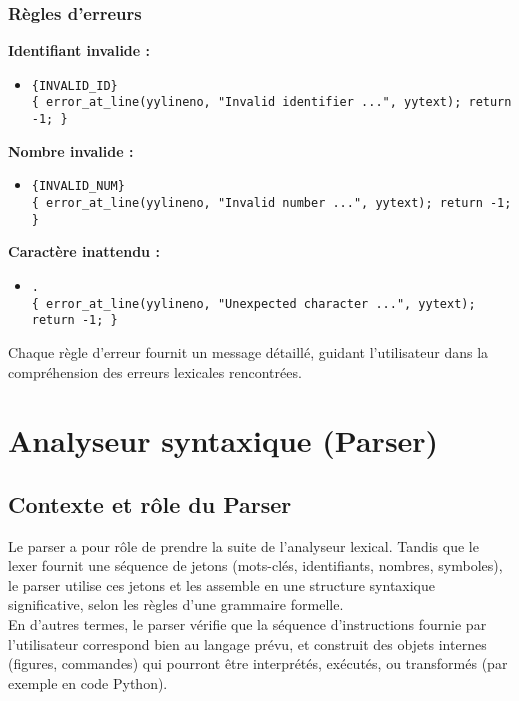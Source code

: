 \documentclass[12pt,a4paper]{article}
\begin{document}
\subsubsection*{Règles d’erreurs}
\textbf{Identifiant invalide :}
\begin{itemize}
    \item \texttt{\{INVALID\_ID\}} \\
    \texttt{\{ error\_at\_line(yylineno, "Invalid identifier ...", yytext); return -1; \}}
\end{itemize}

\textbf{Nombre invalide :}
\begin{itemize}
    \item \texttt{\{INVALID\_NUM\}} \\
    \texttt{\{ error\_at\_line(yylineno, "Invalid number ...", yytext); return -1; \}}
\end{itemize}

\textbf{Caractère inattendu :}
\begin{itemize}
    \item \texttt{.} \\
    \texttt{\{ error\_at\_line(yylineno, "Unexpected character ...", yytext); return -1; \}}
\end{itemize}

Chaque règle d’erreur fournit un message détaillé, guidant l’utilisateur dans la compréhension des erreurs lexicales rencontrées.

\newpage
\section{Analyseur syntaxique (Parser)}

\subsection{Contexte et rôle du Parser}

Le parser a pour rôle de prendre la suite de l’analyseur lexical. Tandis que le lexer fournit une séquence de jetons (mots-clés, identifiants, nombres, symboles), le parser utilise ces jetons et les assemble en une structure syntaxique significative, selon les règles d’une grammaire formelle. \\

En d’autres termes, le parser vérifie que la séquence d’instructions fournie par l’utilisateur correspond bien au langage prévu, et construit des objets internes (figures, commandes) qui pourront être interprétés, exécutés, ou transformés (par exemple en code Python). \\
\end{document}
